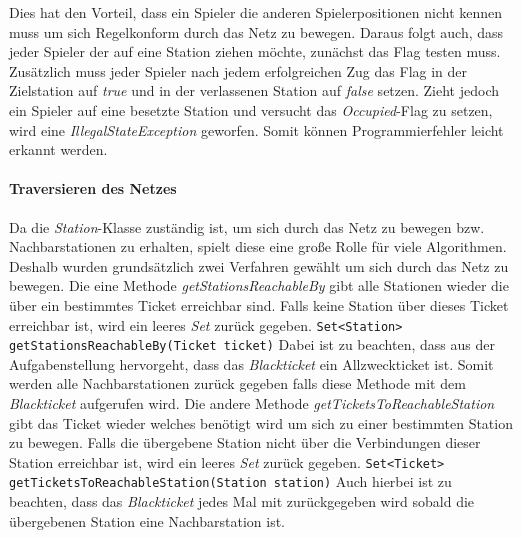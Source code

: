                     Dies hat den Vorteil, dass ein Spieler die anderen Spielerpositionen nicht kennen muss um sich Regelkonform durch das Netz zu bewegen.
                    Daraus folgt auch, dass jeder Spieler der auf eine Station ziehen möchte, zunächst das Flag testen muss.
                    Zusätzlich muss jeder Spieler nach jedem erfolgreichen Zug das Flag in der Zielstation auf \textit{true} und in der verlassenen Station
                    auf \textit{false} setzen.
                    Zieht jedoch ein Spieler auf eine besetzte Station und versucht das \textit{Occupied}-Flag zu setzen, wird eine \textit{IllegalStateException}
                    geworfen. Somit können Programmierfehler leicht erkannt werden.

                \paragraph{Traversieren des Netzes}
                    Da die \textit{Station}-Klasse zuständig ist, um sich durch das Netz zu bewegen bzw. Nachbarstationen zu erhalten,
                    spielt diese eine große Rolle für viele Algorithmen.
                    Deshalb wurden grundsätzlich zwei Verfahren gewählt um sich durch das Netz zu bewegen.
                    \newline
                    Die eine Methode \textit{getStationsReachableBy} gibt alle Stationen wieder die über ein bestimmtes Ticket erreichbar sind.
                    Falls keine Station über dieses Ticket erreichbar ist, wird ein leeres \textit{Set} zurück gegeben.
                    \newline
                    \newline
                    \texttt{Set<Station> getStationsReachableBy(Ticket ticket)}
                    \newline
                    \newline
                    Dabei ist zu beachten, dass aus der Aufgabenstellung hervorgeht, dass das \textit{Blackticket} ein Allzweckticket ist.
                    Somit werden alle Nachbarstationen zurück gegeben falls diese Methode mit dem \textit{Blackticket} aufgerufen wird.
                    \newline
                    Die andere Methode \textit{getTicketsToReachableStation} gibt das Ticket wieder welches benötigt wird um sich zu einer bestimmten Station zu bewegen.
                    Falls die übergebene Station nicht über die Verbindungen dieser Station erreichbar ist, wird ein leeres \textit{Set} zurück gegeben.
                    \newline
                    \newline
                    \texttt{Set<Ticket> getTicketsToReachableStation(Station station)}
                    \newline
                    \newline
                    Auch hierbei ist zu beachten, dass das \textit{Blackticket} jedes Mal mit zurückgegeben wird sobald die
                    übergebenen Station eine Nachbarstation ist.
 
